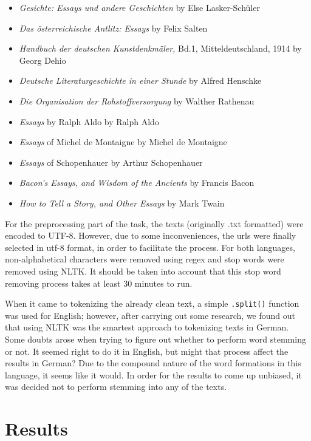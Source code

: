 \documentclass[a4paper]{article}
\begin{document}
\begin{itemize}
\item \textit{Gesichte: Essays und andere Geschichten} by Else Lasker-Schüler
\item \textit{Das österreichische Antlitz: Essays} by Felix Salten
\item \textit{Handbuch der deutschen Kunstdenkmäler,} Bd.1, Mitteldeutschland, 1914 by Georg Dehio
\item \textit{Deutsche Literaturgeschichte in einer Stunde} by Alfred Henschke
\item \textit{Die Organisation der Rohstoffversorgung} by Walther Rathenau
\item \textit{Essays} by Ralph Aldo by Ralph Aldo
\item \textit{Essays} of Michel de Montaigne by Michel de Montaigne
\item \textit{Essays} of Schopenhauer by Arthur Schopenhauer
\item \textit{Bacon's Essays, and Wisdom of the Ancients} by Francis Bacon
\item \textit{How to Tell a Story, and Other Essays} by Mark Twain
\end{itemize}

For the preprocessing part of the task, the texts (originally .txt formatted)
were encoded to UTF-8. However, due to some inconveniences, the urls were
finally selected in utf-8 format, in order to facilitate the process. For
both languages, non-alphabetical characters were removed using regex and
stop words were removed using NLTK. It should be taken into account that
this stop word removing process takes at least 30 minutes to run.

When it came to tokenizing the already clean text, a simple \texttt{.split()} function
was used for English; however, after carrying out some research, we found out
that using NLTK was the smartest approach to tokenizing texts in German. Some
doubts arose when trying to figure out whether to perform word stemming or not.
It seemed right to do it in English, but might that process affect the results
in German? Due to the compound nature of the word formations in this language,
it seems like it would. In order for the results to come up unbiased, it was
decided not to perform stemming into any of the texts.

\section{Results}
\end{document}
